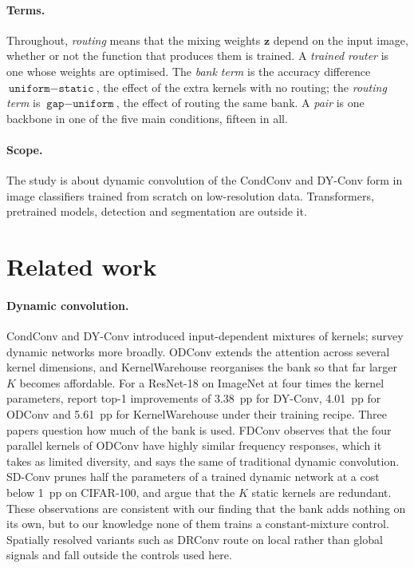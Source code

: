 \documentclass[10pt,a4paper]{article}
\newcommand{\zv}{\mathbf{z}}
\begin{document}
\paragraph{Terms.} Throughout, \emph{routing} means that the mixing
weights $\zv$ depend on the input image, whether or not the function that
produces them is trained. A \emph{trained router} is one whose weights are
optimised. The \emph{bank term} is the accuracy difference
$\texttt{uniform}-\texttt{static}$, the effect of the extra kernels with
no routing; the \emph{routing term} is $\texttt{gap}-\texttt{uniform}$,
the effect of routing the same bank. A \emph{pair} is one backbone in one
of the five main conditions, fifteen in all.

\paragraph{Scope.} The study is about dynamic convolution of the CondConv
and DY-Conv form in image classifiers trained from scratch on
low-resolution data. Transformers, pretrained models, detection and
segmentation are outside it.

\section{Related work}\label{sec:related}

\paragraph{Dynamic convolution.} CondConv \citep{yang2019condconv} and
DY-Conv \citep{chen2020dynamic} introduced input-dependent mixtures of
kernels; \citet{han2022dynamic} survey dynamic networks more broadly.
ODConv \citep{li2022odconv} extends the attention across several kernel
dimensions, and KernelWarehouse \citep{li2024kernelwarehouse} reorganises
the bank so that far larger $K$ becomes affordable. For a ResNet-18 on
ImageNet at four times the kernel parameters, \citet{li2024kernelwarehouse}
report top-1 improvements of \SI{3.38}{pp} for DY-Conv, \SI{4.01}{pp} for
ODConv and \SI{5.61}{pp} for KernelWarehouse under their training recipe.
Three papers question how much of the bank is used. FDConv
\citep{chen2025fdconv} observes that the four parallel kernels of ODConv have
highly similar frequency responses, which it takes as limited diversity, and
says the same of traditional dynamic convolution. SD-Conv \citep{he2023sdconv}
prunes half the parameters of a trained dynamic network at a cost below
\SI{1}{pp} on CIFAR-100, and \citet{li2021dcd} argue that the $K$ static
kernels are redundant. These observations are consistent with our finding
that the bank adds nothing on its own, but to our knowledge none of them trains a
constant-mixture control. Spatially resolved variants such as DRConv
\citep{chen2021drconv} route on local rather than global signals and fall
outside the controls used here.
\end{document}
